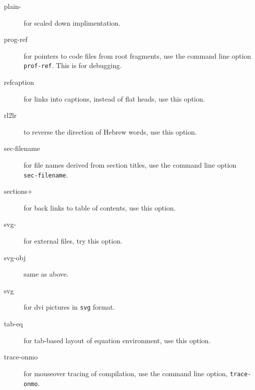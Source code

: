 \begin{description}
\item[plain-] for scaled down implimentation.




\item[prog-ref] for pointers to code files from root fragments, use
  the command line option \verb=prof-ref=. This is for debugging.

\item[refcaption] for links into captions, instead of flat heads, use
  this option.

\item[rl2lr] to reverse the direction of Hebrew words, use this
  option.

\item[sec-filename] for file names derived from section titles, use
  the command line option \verb=sec-filename=.

\item[sections+] for back links to table of contents, use this option.


\item[svg-] for external \svg files, try this option.

\item[svg-obj] same as above.

\item[svg] for dvi pictures in \verb=svg= format.

\item[tab-eq] for tab-based layout of equation environment, use this
  option.


\item[trace-onmo] for mouseover tracing of compilation, use the
  command line option, \verb=trace-onmo=.



\end{description}
